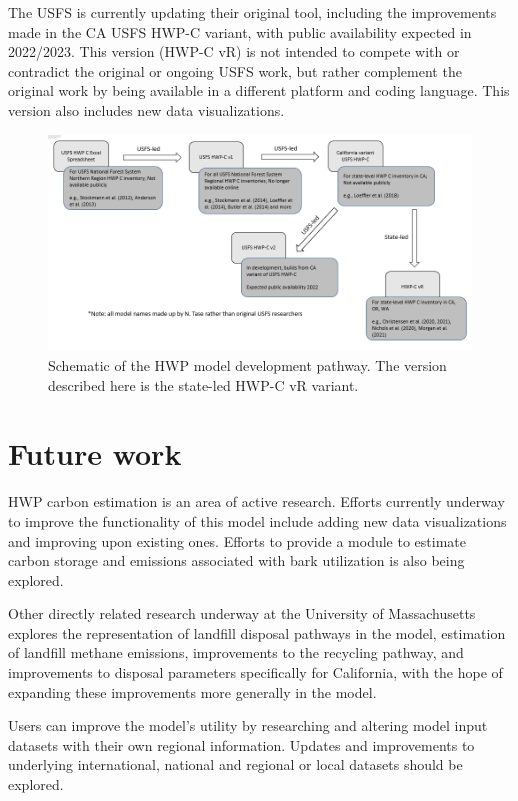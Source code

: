 \documentclass[
  openany]{book}
\begin{document}
The USFS is currently updating their original tool, including the
improvements made in the CA USFS HWP-C variant, with public availability
expected in 2022/2023. This version (HWP-C vR) is not intended to
compete with or contradict the original or ongoing USFS work, but rather
complement the original work by being available in a different platform
and coding language. This version also includes new data visualizations.

\begin{figure}
\includegraphics[width=1\linewidth]{images/ModelHistory} \caption{Schematic of the HWP model development pathway.  The version described here is the state-led HWP-C vR variant.}\label{fig:hist-fig}
\end{figure}

\hypertarget{int-future}{%
\section{Future work}\label{int-future}}

HWP carbon estimation is an area of active research. Efforts currently
underway to improve the functionality of this model include adding new
data visualizations and improving upon existing ones. Efforts to provide
a module to estimate carbon storage and emissions associated with bark
utilization is also being explored.

Other directly related research underway at the University of
Massachusetts explores the representation of landfill disposal pathways
in the model, estimation of landfill methane emissions, improvements to
the recycling pathway, and improvements to disposal parameters
specifically for California, with the hope of expanding these
improvements more generally in the model.

Users can improve the model's utility by researching and altering model
input datasets with their own regional information. Updates and
improvements to underlying international, national and regional or local
datasets should be explored.
\end{document}
